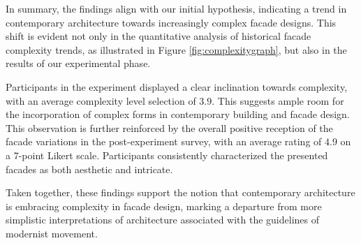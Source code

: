 
In summary, the findings align with our initial hypothesis, indicating a trend in contemporary architecture towards increasingly complex facade designs.
This shift is evident not only in the quantitative analysis of historical facade complexity trends, as illustrated in Figure \ref{fig:complexitygraph}, but also in the results of our experimental phase.

Participants in the experiment displayed a clear inclination towards complexity, with an average complexity level selection of \(3.9\).
This suggests ample room for the incorporation of complex forms in contemporary building and facade design.
This observation is further reinforced by the overall positive reception of the facade variations in the post-experiment survey, with an average rating of \(4.9\) on a 7-point Likert scale.
Participants consistently characterized the presented facades as both aesthetic and intricate.

Taken together, these findings support the notion that contemporary architecture is embracing complexity in facade design, marking a departure from more simplistic interpretations of architecture associated with the guidelines of modernist movement.


